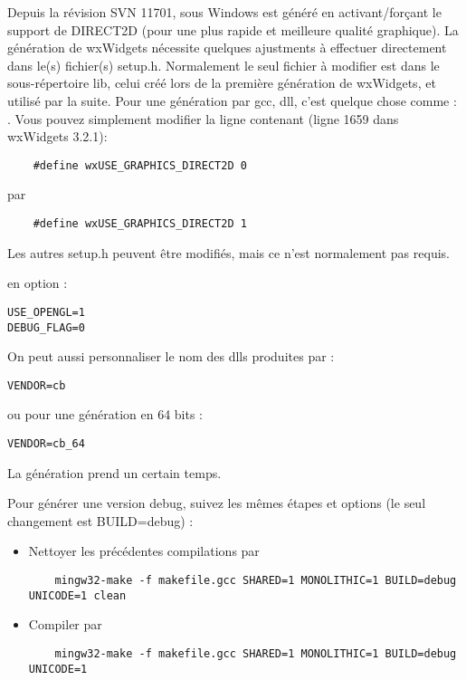 Depuis la révision SVN 11701, \codeblocks sous Windows est généré en activant/forçant le support de DIRECT2D (pour une plus rapide et meilleure qualité graphique). La génération de wxWidgets nécessite quelques ajustments à effectuer directement dans le(s) fichier(s) setup.h. Normalement le seul fichier à modifier est dans le sous-répertoire lib, celui créé lors de la première génération de wxWidgets, et utilisé par la suite. Pour une génération par gcc, dll, c'est quelque chose comme :\newline
{}.\newline
Vous pouvez simplement modifier la ligne contenant (ligne 1659 dans wxWidgets 3.2.1):
\begin{verbatim}
    #define wxUSE_GRAPHICS_DIRECT2D 0 
\end{verbatim}
par
\begin{verbatim}
    #define wxUSE_GRAPHICS_DIRECT2D 1  
\end{verbatim}
Les autres setup.h peuvent être modifiés, mais ce n'est normalement pas requis.

en option :
\begin{verbatim}
USE_OPENGL=1
DEBUG_FLAG=0
\end{verbatim}


On peut aussi personnaliser le nom des dlls produites par :
\begin{verbatim}
VENDOR=cb
\end{verbatim}
ou pour une génération en 64 bits :
\begin{verbatim}
VENDOR=cb_64
\end{verbatim}


La génération prend un certain temps.

Pour générer une version debug, suivez les mêmes étapes et options (le seul changement est BUILD=debug) :

\begin{itemize}
\item Nettoyer les précédentes compilations par
	\begin{verbatim}
	mingw32-make -f makefile.gcc SHARED=1 MONOLITHIC=1 BUILD=debug UNICODE=1 clean
	\end{verbatim}
\item Compiler par
	\begin{verbatim}
	mingw32-make -f makefile.gcc SHARED=1 MONOLITHIC=1 BUILD=debug UNICODE=1
	\end{verbatim}
\end{itemize}

